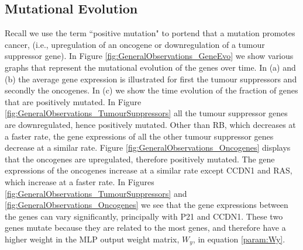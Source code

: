 \documentclass[\main/thesis.tex]{subfiles}
\begin{document}
\subsection{Mutational Evolution}
Recall we use the term ``positive mutation" to portend that a mutation promotes cancer, (i.e., upregulation of an oncogene or downregulation of a tumour suppressor gene). 
In Figure \ref{fig:GeneralObservations_GeneEvo} we show various graphs that represent the mutational evolution of the genes over time. In (a) and (b) the average gene expression is illustrated for first the tumour suppressors and secondly the oncogenes. In (c) we show the time evolution of the fraction of genes that are positively mutated. 
In Figure \ref{fig:GeneralObservations_TumourSuppressors} all the tumour suppressor genes are downregulated, hence positively mutated. Other than RB, which decreases at a faster rate, the gene expressions of all the other tumour suppressor genes decrease at a similar rate. Figure \ref{fig:GeneralObservations_Oncogenes} displays that the oncogenes are upregulated, therefore positively mutated. The gene expressions of the oncogenes increase at a similar rate except CCDN1 and RAS, which increase at a faster rate. In Figures \ref{fig:GeneralObservations_TumourSuppressors} and \ref{fig:GeneralObservations_Oncogenes} we see that the gene expressions between the genes can vary significantly, principally with P21 and CCDN1. These two genes mutate because they are related to the most genes, and therefore have a higher weight in the MLP output weight matrix, $W_y$, in equation \eqref{param:Wy}.
\end{document}
